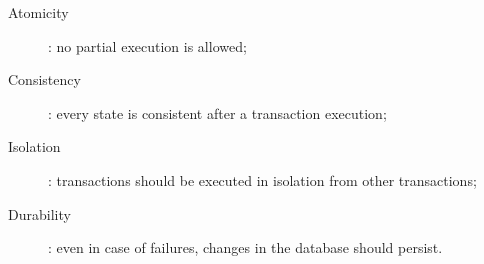 \documentclass[../../DD.tex]{subfiles}
\begin{document}
	\begin{description}
	\item[Atomicity]: no partial execution is allowed;
	\item[Consistency]: every state is consistent after a transaction execution;
	\item[Isolation]: transactions should be executed in isolation from other transactions;
	\item[Durability]: even in case of failures, changes in the database should persist.
	\end{description}
\end{document}

